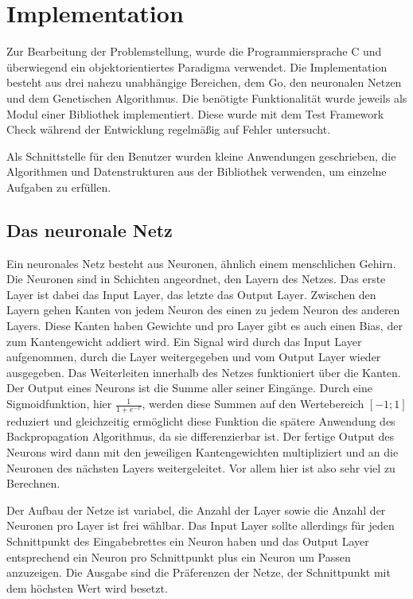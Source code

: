 \section{Implementation}

Zur Bearbeitung der Problemstellung, wurde die Programmiersprache C und
überwiegend ein objektorientiertes Paradigma verwendet.  Die Implementation
besteht aus drei nahezu unabhängige Bereichen, dem Go, den neuronalen Netzen
und dem Genetischen Algorithmus. Die benötigte Funktionalität wurde jeweils als
Modul einer Bibliothek implementiert.  Diese wurde mit dem Test Framework Check
\cite{check} während der Entwicklung regelmäßig auf Fehler untersucht.

Als Schnittstelle für den Benutzer wurden kleine Anwendungen geschrieben, die
Algorithmen und Datenstrukturen aus der Bibliothek verwenden, um einzelne
Aufgaben zu erfüllen.


\subsection{Das neuronale Netz}

Ein neuronales Netz besteht aus Neuronen, ähnlich einem menschlichen Gehirn. Die
Neuronen sind in Schichten angeordnet, den Layern des Netzes. Das erste Layer
ist dabei das Input Layer, das letzte das Output Layer. Zwischen den Layern
gehen Kanten von jedem Neuron des einen zu jedem Neuron des anderen Layers.
Diese Kanten haben Gewichte und pro Layer gibt es auch einen Bias, der zum
Kantengewicht addiert wird. Ein Signal wird durch das Input Layer aufgenommen,
durch die Layer weitergegeben und vom Output Layer wieder ausgegeben. Das
Weiterleiten innerhalb des Netzes funktioniert über die Kanten. Der Output eines
Neurons ist die Summe aller seiner Eingänge. Durch eine Sigmoidfunktion, hier
$\frac{1}{1 + e^{-x}}$, werden diese Summen auf den Wertebereich $[-1;1]$
reduziert und gleichzeitig ermöglicht diese Funktion die spätere Anwendung des
Backpropagation Algorithmus, da sie differenzierbar ist. Der fertige Output des
Neurons wird dann mit den jeweiligen Kantengewichten multipliziert und an die
Neuronen des nächsten Layers weitergeleitet. Vor allem hier ist also sehr viel
zu Berechnen. 

Der Aufbau der Netze ist variabel, die Anzahl der Layer sowie die Anzahl der
Neuronen pro Layer ist frei wählbar. Das Input Layer sollte allerdings für jeden
Schnittpunkt des Eingabebrettes ein Neuron haben und das Output Layer
entsprechend ein Neuron pro Schnittpunkt plus ein Neuron um Passen anzuzeigen.
Die Ausgabe sind die Präferenzen der Netze, der Schnittpunkt mit dem höchsten
Wert wird besetzt. 

